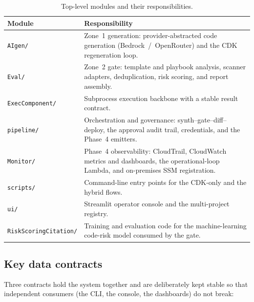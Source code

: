 \begin{table}[ht]
\centering
\caption{Top-level modules and their responsibilities.}
\label{tab:modules}
\begin{tabular}{|L{3.0cm}|L{9.0cm}|}
\hline
\textbf{Module} & \textbf{Responsibility} \\
\hline
\texttt{AIgen/} & Zone~1 generation: provider-abstracted code generation
(Bedrock~/~OpenRouter) and the CDK regeneration loop. \\
\hline
\texttt{Eval/} & Zone~2 gate: template and playbook analysis, scanner adapters,
deduplication, risk scoring, and report assembly. \\
\hline
\texttt{ExecComponent/} & Subprocess execution backbone with a stable result contract. \\
\hline
\texttt{pipeline/} & Orchestration and governance: synth--gate--diff--deploy, the approval
audit trail, credentials, and the Phase~4 emitters. \\
\hline
\texttt{Monitor/} & Phase~4 observability: CloudTrail, CloudWatch metrics and
dashboards, the operational-loop Lambda, and on-premises SSM registration. \\
\hline
\texttt{scripts/} & Command-line entry points for the CDK-only and the hybrid flows. \\
\hline
\texttt{ui/} & Streamlit operator console and the multi-project registry. \\
\hline
\texttt{RiskScoringCitation/} & Training and evaluation code for the machine-learning
code-risk model consumed by the gate. \\
\hline
\end{tabular}
\end{table}

\subsection{Key data contracts}
\label{subsec:arch-contracts}

Three contracts hold the system together and are deliberately kept stable so that
independent consumers (the CLI, the console, the dashboards) do not break:


